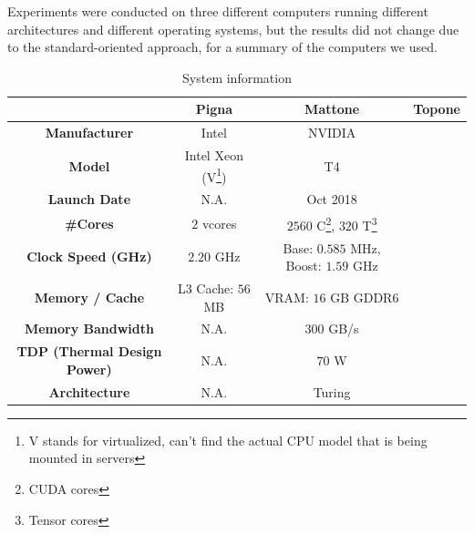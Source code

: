 Experiments were conducted on three different computers running different architectures and
different operating systems, but the results did not change due to the standard-oriented approach,
 for a summary of the computers we used.
\begin{center}
	\begin{longtable}{|c|c|c|c|}
		\caption{System information}\label{tbl:computers}
		\\\textbf{} & \textbf{Pigna} & \textbf{Mattone} & \textbf{Topone} \\\hline\hline
		\endfirsthead\hline\endlastfoot

		\textbf{Manufacturer}               & Intel                                                                                                               & NVIDIA                                                              \\\hline

		\textbf{Model}                      & Intel Xeon (V\footnote{V stands for virtualized, can't find the actual CPU model that is being mounted in servers}) & T4                                                                  \\\hline
		\textbf{Launch Date}                & N.A.                                                                                                                & Oct 2018                                                            \\\hline
		\textbf{\#Cores}                    & $2$ vcores                                                                                                          & $\num{2560}$ C\footnote{CUDA cores}, $320$ T\footnote{Tensor cores} \\\hline
		\textbf{Clock Speed (GHz)}          & $\num{2.20}$ GHz                                                                                                    & Base: $0.585$ MHz, Boost: $1.59$ GHz                                \\\hline
		\textbf{Memory / Cache}             & L3 Cache: $56$ MB                                                                                                   & VRAM: $16$ GB GDDR6                                                 \\\hline
		\textbf{Memory Bandwidth}           & N.A.                                                                                                                & 300 GB/s                                                            \\\hline
		\textbf{TDP (Thermal Design Power)} & N.A.                                                                                                                & $70$ W                                                              \\\hline
		\textbf{Architecture}               & N.A.                                                                                                                & Turing
	\end{longtable}
\end{center}








